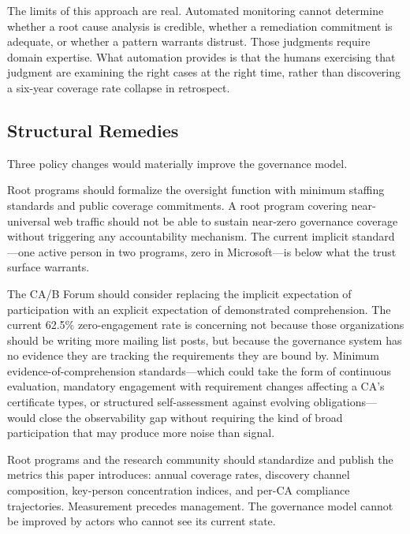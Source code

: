 \documentclass[10pt,twocolumn,letterpaper]{article}
\begin{document}
The limits of this approach are real. Automated monitoring cannot determine
whether a root cause analysis is credible, whether a remediation commitment
is adequate, or whether a pattern warrants distrust. Those judgments require
domain expertise. What automation provides is that the humans exercising that
judgment are examining the right cases at the right time, rather than
discovering a six-year coverage rate collapse in retrospect.

\subsection{Structural Remedies}
Three policy changes would materially improve the governance model.

Root programs should formalize the oversight function with minimum staffing
standards and public coverage commitments. A root program covering
near-universal web traffic should not be able to sustain near-zero
governance coverage without triggering any accountability mechanism.
The current implicit standard---one active person in two programs, zero
in Microsoft---is below what the trust surface warrants.

The CA/B Forum should consider replacing the implicit expectation of
participation with an explicit expectation of demonstrated comprehension.
The current 62.5\% zero-engagement rate is concerning not because those
organizations should be writing more mailing list posts, but because the
governance system has no evidence they are tracking the requirements they
are bound by. Minimum evidence-of-comprehension standards---which could
take the form of continuous evaluation, mandatory engagement with
requirement changes affecting a CA's certificate types, or structured
self-assessment against evolving obligations---would close the
observability gap without requiring the kind of broad participation that
may produce more noise than signal.

Root programs and the research community should standardize and publish
the metrics this paper introduces: annual coverage rates, discovery channel
composition, key-person concentration indices, and per-CA compliance
trajectories. Measurement precedes management. The governance model cannot
be improved by actors who cannot see its current state.
\end{document}
